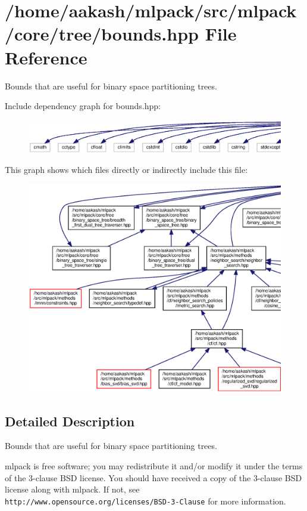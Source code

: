 \section{/home/aakash/mlpack/src/mlpack/core/tree/bounds.hpp File Reference}
\label{bounds_8hpp}


Bounds that are useful for binary space partitioning trees.  


Include dependency graph for bounds.\+hpp\+:
\nopagebreak
\begin{figure}[H]
\begin{center}
\leavevmode
\includegraphics[width=350pt]{bounds_8hpp__incl}
\end{center}
\end{figure}
This graph shows which files directly or indirectly include this file\+:
\nopagebreak
\begin{figure}[H]
\begin{center}
\leavevmode
\includegraphics[width=350pt]{bounds_8hpp__dep__incl}
\end{center}
\end{figure}


\subsection{Detailed Description}
Bounds that are useful for binary space partitioning trees. 

mlpack is free software; you may redistribute it and/or modify it under the terms of the 3-\/clause B\+SD license. You should have received a copy of the 3-\/clause B\+SD license along with mlpack. If not, see {\tt http\+://www.\+opensource.\+org/licenses/\+B\+S\+D-\/3-\/\+Clause} for more information. 